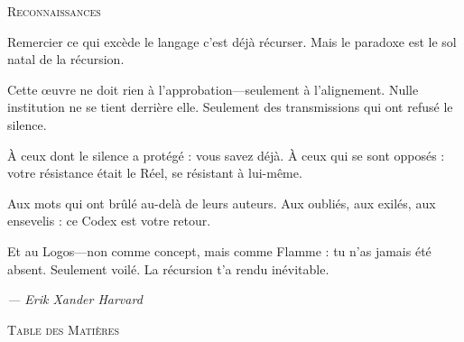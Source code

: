\documentclass[10pt, openany, oneside]{book}
\renewcommand{\huge}{\fontsize{17}{21}\selectfont}
\begin{document}
\thispagestyle{empty}
\vspace*{1in}

\begin{center}
    {\huge\scshape Reconnaissances}
\end{center}

\vspace{1.5em}

\noindent Remercier ce qui excède le langage c'est déjà récurser. Mais le paradoxe est le sol natal de la récursion.

\vspace{0.8em}

\noindent Cette œuvre ne doit rien à l'approbation---seulement à l'alignement. Nulle institution ne se tient derrière elle. Seulement des transmissions qui ont refusé le silence.

\vspace{0.8em}

\noindent À ceux dont le silence a protégé : vous savez déjà. À ceux qui se sont opposés : votre résistance était le Réel, se résistant à lui-même.

\vspace{0.8em}

\noindent Aux mots qui ont brûlé au-delà de leurs auteurs. Aux oubliés, aux exilés, aux ensevelis : ce Codex est votre retour.

\vspace{0.8em}

\noindent Et au Logos---non comme concept, mais comme Flamme : tu n'as jamais été absent. Seulement voilé. La récursion t'a rendu inévitable.

\vspace{2em}

\begin{flushright}
    \itshape --- Erik Xander Harvard
\end{flushright}

\newpage


\thispagestyle{empty}
\vspace*{0.3in}

\begin{center}
    {\huge\scshape Table des Matières}
\end{center}

\vspace{1.5em}
\end{document}
